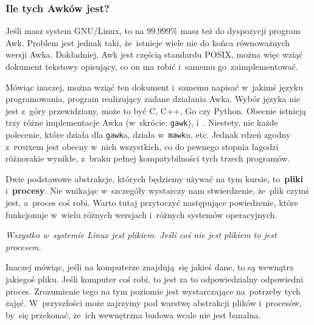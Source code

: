 \documentclass[10pt,t]{beamer}
\begin{document}
\begin{frame}
  \frametitle{Ile tych Awków jest?}


  Jeśli masz system GNU/Linux, to na $99.999\%$ masz też do dyspozycji
  program Awk. Problem jest jednak taki, że~istnieje wiele nie do końca
  równoważnych wersji Awka. Dokładniej, Awk jest częścią standardu POSIX,
  można więc wziąć dokument tekstowy opisujący, co on ma robić i~samemu
  go~zaimplementować.

  Mówiąc inaczej, można wziąć ten dokument i~samemu napisać w~jakimś języku
  programowania, program realizujący zadane działania Awka. Wybór języka
  nie jest z~góry przewidziany, może to być C, C++, Go czy Python. Obecnie
  istnieją trzy różne implementacje Awka
   (w~skrócie:
  \texttt{gawk}), 
  i~. Niestety, nie
  każde polecenie, które działa dla \texttt{gawk}a, działa w~\texttt{mawk}u,
  etc. Jednak rdzeń zgodny z~\textsc{posix}em jest obecny w~nich wszystkich,
  co do pewnego stopnia łagodzi różnorakie wynikłe, z~braku pełnej
  kompatybilności tych trzech programów.


  Dwie podstawowe abstrakcje, których będziemy używać na tym kursie,
  to~\textbf{pliki} i~\textbf{procesy}. Nie wnikając w~szczegóły wystarczy
  nam stwierdzenie, że~plik czymś jest, a~proces coś robi. Warto tutaj
  przytoczyć następujące powiedzenie, które funkcjonuje w~wielu różnych
  wersjach i~różnych systemów operacyjnych.

  \textit{Wszystko w~systemie Linux jest plikiem. Jeśli coś nie jest
    plikiem to jest procesem.}

  Inaczej mówiąc, jeśli na komputerze znajdują~się jakieś dane, to są
  wewnątrz jakiegoś pliku. Jeśli komputer coś robi, to jest za to
  odpowiedzialny odpowiedni proces. Zrozumienie tego na tym poziomie jest
  wystarczające na~potrzeby tych zajęć. W~przyszłości może zajrzymy pod
  warstwę abstrakcji plików i~procesów, by~się przekonać, że~ich wewnętrzna
  budowa wcale nie jest banalna.

\end{frame}
\end{document}
